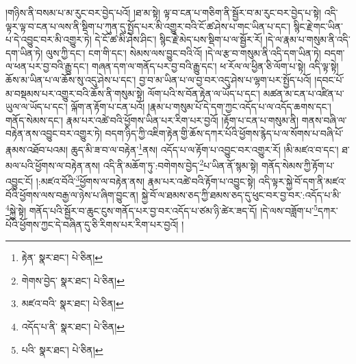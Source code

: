 །གཉིས་ནི་བསམ་པ་མ་རུང་བར་བྱེད་པའོ། །ཐ་མ་སྟེ། ལྟ་བ་ངན་པ་གཅིག་ནི་སྦྱོར་བ་མ་རུང་བར་བྱེད་པ་སྟེ། འདི་ལྟར་ལྟ་བ་ངན་པ་ལས་ནི་སྡིག་པ་ཀུན་དུ་སྤྱོད་པར་མི་འགྱུར་བའི་ངོ་ཚ་ཤེས་པ་གང་ཡིན་པ་དང་། སྙིང་རྗེ་གང་ཡིན་པ་དེ་འབྱུང་བར་མི་འགྱུར་ཏེ། དེ་ངོ་ཚ་མི་ཤེས་ཤིང་། སྙིང་རྗེ་མེད་པས་སྡིག་པ་ལ་སྦྱོར་རོ། །དེ་ལ་རྣམ་པ་གསུམ་ནི་འདི་དག་ཡིན་ཏེ། ལུས་ཀྱི་དང་། ངག་གི་དང་། སེམས་ལས་བྱུང་བའི་འོ། །དེ་ལ་རྩ་བ་གསུམ་ནི་འདི་དག་ཡིན་ཏེ། བདག་ལ་ཕན་པར་བྱ་བའི་རྒྱུ་དང་། གཞན་དག་ལ་གནོད་པར་བྱ་བའི་རྒྱུ་དང་། ཕ་རོལ་ལ་ཕྱིན་ཅི་ལོག་པ་སྟེ། འདི་ལྟ་སྟེ། ཆོས་མ་ཡིན་པ་ལ་ཆོས་སུ་འདུ་ཤེས་པ་དང་། བྱ་བ་མ་ཡིན་པ་ལ་བྱ་བར་འདུ་ཤེས་པ་ལྷག་པར་སྤྱོད་པའོ། །དབང་པོ་མ་བསྡམས་པར་འགྱུར་བའི་ཆོས་ནི་གསུམ་སྟེ། ལོག་པའི་ས་བོན་རྟེན་ལ་ཡོད་པ་དང་། མཚན་མ་ངན་པ་འཛིན་པ་ཡུལ་ལ་ཡོད་པ་དང་། ལྐོག་ན་རྟོག་པ་ངན་པའོ། །རྣམ་པ་གསུམ་པོ་དེ་དག་ཀྱང་འདོད་པ་ལ་འདོད་ཆགས་དང་། གནོད་སེམས་དང་། རྣམ་པར་འཚེ་བའི་ཕྱོགས་ཡིན་པར་རིག་པར་བྱའོ། །རྟོག་པ་ངན་པ་གསུམ་ནི། གནས་བཞི་ལ་བརྟེན་ནས་འབྱུང་བར་འགྱུར་ཏེ། བདག་ཉིད་ཀྱི་འཇིག་རྟེན་གྱི་ཆོས་དཀར་པོའི་ཕྱོགས་རྙེད་པ་ལ་སོགས་པ་བཞི་པོ་རྣམས་འཐོབ་པའམ། ཆུད་མི་ཟ་བ་ལ་བརྟེན་\footnote{རྟེན་  སྣར་ཐང་།  པེ་ཅིན། }ནས། འདོད་པ་ལ་རྟོག་པ་འབྱུང་བར་འགྱུར་རོ། །མི་མཛའ་བ་དང་། ཐ་མལ་པའི་ཕྱོགས་ལ་བརྟེན་ནས། འདི་ནི་མཆོག་ཏུ་:བགེགས་བྱེད་\footnote{གེགས་བྱེད་  སྣར་ཐང་།  པེ་ཅིན། }པ་ཡིན་ནོ་སྙམ་སྟེ། གནོད་སེམས་ཀྱི་རྟོག་པ་འབྱུང་ངོ། །:མཛའ་བོའི་\footnote{མཛའ་བའི་  སྣར་ཐང་།  པེ་ཅིན། }ཕྱོགས་ལ་བརྟེན་ནས། རྣམ་པར་འཚེ་བའི་རྟོག་པ་འབྱུང་སྟེ། འདི་ལྟར་སྐྱེ་བོ་དག་ནི་མཛའ་བོའི་ཕྱོགས་ལས་བརྒྱ་ལ་ཉེས་པ་ཞིག་བྱུང་ན། སྐྱེ་བོ་ལ་ཐམས་ཅད་ཀྱི་ཐམས་ཅད་དུ་ཕུང་བར་བྱ་བར་:འདོད་པ་མི་\footnote{འདོད་པ་ནི་  སྣར་ཐང་།  པེ་ཅིན། }སྐྱེ་སྟེ། གནོད་པའི་སྦྱོར་བ་ཆུང་ངུས་གནོད་པར་བྱ་བར་འདོད་པ་ཙམ་ཉི་ཚེར་ཟད་དོ། །དེ་ལས་བཟློག་པ་\footnote{པའི་  སྣར་ཐང་།  པེ་ཅིན། }དཀར་པོའི་ཕྱོགས་ཀྱང་དེ་བཞིན་དུ་ཅི་རིགས་པར་རིག་པར་བྱའོ། །
